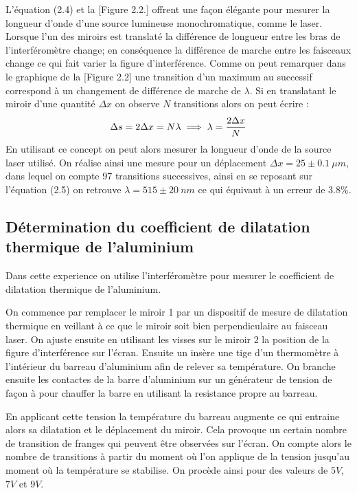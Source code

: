 \documentclass[11pt, openright]{book}
\begin{document}
					L'équation (2.4)  et la [Figure 2.2.] offrent une façon élégante pour mesurer la longueur d'onde d'une source lumineuse monochromatique, comme le laser. Lorsque l'un des miroirs est translaté la différence de longueur entre les bras de l'interféromètre change; en conséquence la différence de marche entre les faisceaux change ce qui fait varier la figure d'interférence. Comme on peut remarquer dans le graphique de la [Figure 2.2] une transition d'un maximum au successif correspond à un changement de différence de marche de $\lambda$. Si en translatant le miroir d'une quantité $\Delta x$ on observe $N$ transitions alors on peut écrire : 
					\begin{equation}
						\displaystyle{\Delta s = 2\Delta x = N\lambda \implies \lambda=\frac{2\Delta x}{N}}
					\end{equation}
					En utilisant ce concept on peut alors mesurer la longueur d'onde de la source laser utilisé. On réalise ainsi une mesure pour un déplacement $\Delta x = 25\pm 0.1\ \mu m$, dans lequel on compte 97 transitions successives, ainsi en se reposant sur l'équation (2.5) on retrouve $\lambda=515\pm 20\ nm$ ce qui équivaut à un erreur de 3.8\%.

				\subsection{Détermination du coefficient  de dilatation thermique de l'aluminium}

					Dans cette experience on utilise l'interféromètre pour mesurer le coefficient de dilatation thermique de l'aluminium.

					On commence par remplacer le miroir 1 par un dispositif de mesure de dilatation thermique en veillant à ce que le miroir soit bien perpendiculaire au faisceau laser. On ajuste ensuite en utilisant les visses sur le miroir 2 la position de la figure d'interférence sur l'écran. Ensuite un insère une tige d'un thermomètre à l'intérieur du barreau d'aluminium afin de relever sa température. On branche ensuite les contactes de la barre d'aluminium sur un générateur de tension de façon à pour chauffer la barre en utilisant la resistance propre au barreau.

					En applicant cette tension la température du barreau augmente ce qui entraine alors sa dilatation et le déplacement du miroir. Cela provoque un certain nombre de transition de franges qui peuvent être observées sur l'écran. On compte alors le nombre de transitions à partir du moment où l'on applique de la tension jusqu'au moment où la température se stabilise. On procède ainsi pour des valeurs de $5V$, $7V$ et $9V$.
\end{document}
